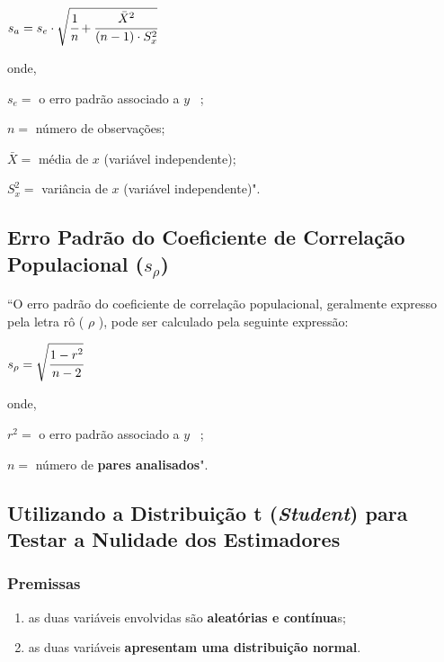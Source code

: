 		\bigskip
		
		{\Large $ s_{a} = s_{e} \cdot \sqrt{\cfrac{1}{n} + \cfrac{\bar X^{2}}{(n - 1) \cdot S_{x}^{2}}} $}
		
		\bigskip
		
		onde,
		
		$ s_{e} = $ o erro padrão associado a $ y $ \ ;

		$ n = $ número de observações;
		
		$ \bar X = $ média de $ x $ (variável independente);
		
		$ S_{x}^{2} = $ variância de $ x $ (variável independente)". \cite{torres}

	\subsection{Erro Padrão do Coeficiente de Correlação Populacional ($ s_{\rho} $)}
	
		``O erro padrão do coeficiente de correlação populacional, geralmente expresso pela letra rô ( $ \rho $ ), pode ser calculado pela seguinte expressão:
	
		\bigskip
		
		{\Large $ s_{\rho} = \sqrt{\cfrac{1 - r^{2}}{n - 2}} $}
		
		\bigskip
		
		onde,
		
		$ r^{2} = $ o erro padrão associado a $ y $ \ ;

		$ n = $ número de \textbf{pares analisados}". \cite{torres}
	
	\subsection{Utilizando a Distribuição t (\textit{Student}) para Testar a Nulidade dos Estimadores \cite{torres}}
	
		\subsubsection{Premissas}
			
			\begin{enumerate}[label=(\alph*)]
		
				\item as duas variáveis envolvidas são \textbf{aleatórias e contínua}s;
				
				\item as duas variáveis \textbf{apresentam uma distribuição normal}.
			
			\end{enumerate}
			
